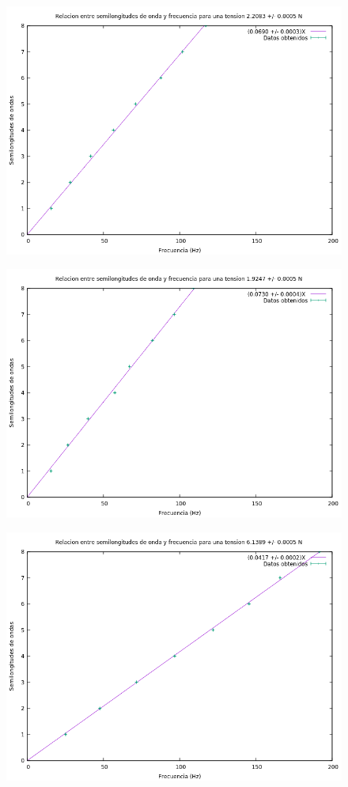 \documentclass[10pt,a4paper]{article}
\begin{document}
\begin{figure}[H]
\includegraphics[scale=0.65]{8.png}
\centering
\end{figure}

\begin{figure}[H]
\includegraphics[scale=0.65]{9.png}
\centering
\end{figure}

\begin{figure}[H]
\includegraphics[scale=0.65]{10.png}
\centering
\end{figure}
\end{document}
